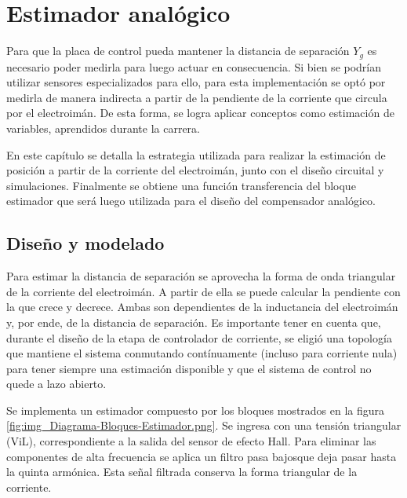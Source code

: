 \chapter{Estimador analógico}  \label{cap:Estimador Analogico}


 Para que la placa de control pueda mantener la distancia de separación $Y_{g}$ es necesario poder medirla para luego actuar en consecuencia. Si bien se podrían utilizar sensores  especializados para ello, para esta implementación se optó por  medirla de manera indirecta a partir de la pendiente de la corriente que circula por el electroimán. De esta forma, se logra aplicar conceptos como estimación de variables, aprendidos durante la carrera. 
 
 En este capítulo se detalla la estrategia utilizada para realizar la estimación de posición a partir de la corriente del electroimán, junto con el diseño circuital y simulaciones. Finalmente se obtiene una función transferencia del bloque estimador que será luego utilizada para el diseño del compensador analógico.

\section{Diseño y modelado}



Para estimar la distancia de separación se aprovecha la forma de onda triangular de la corriente del electroimán. A partir de ella se puede calcular la pendiente con la que crece y decrece. Ambas son dependientes de la inductancia del electroimán y, por ende, de la distancia de separación. Es importante tener en cuenta que, durante el diseño de la etapa de controlador de corriente, se eligió una topología que mantiene el sistema conmutando contínuamente (incluso para corriente nula) para tener siempre una estimación disponible y que el sistema de control no quede a lazo abierto.


\noindent Se implementa un estimador compuesto por los bloques mostrados en la figura \ref{fig:img_Diagrama-Bloques-Estimador.png}. Se ingresa con una tensi\'{o}n triangular (ViL), correspondiente a la salida del sensor de efecto Hall. Para eliminar las componentes de alta frecuencia se aplica un filtro pasa bajosque deja pasar hasta la quinta arm\'{o}nica. Esta se\~{n}al filtrada conserva la forma triangular de la corriente. 

